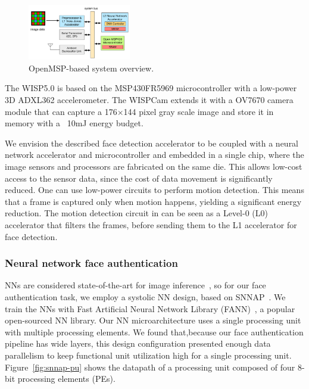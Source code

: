 \begin{figure}[h]
\centering
    \begin{center}
      \includegraphics[width=0.4\textwidth]{nsp-figs/system_overview.pdf}
    \end{center}
\caption{OpenMSP-based system overview.}
\label{fig:OMSP}
\end{figure}

The WISP5.0 is based on the MSP430FR5969 microcontroller with a low-power 3D ADXL362 accelerometer. The WISPCam extends it with a OV7670 camera module that can capture a 176$\times$144 pixel gray scale image and store it in memory with a ~10mJ energy budget.

We envision the described face detection accelerator to be coupled with a neural network accelerator and microcontroller and embedded in a single chip, where the image sensors and processors are fabricated on the same die. This allows low-cost access to the sensor data, since the cost of data movement is significantly reduced. One can use low-power circuits to perform motion detection. This means that a frame is captured only when motion happens, yielding a significant energy reduction. The motion detection circuit in \cite{multipower-isscc13} can be seen as a Level-0 (L0) accelerator that filters the frames, before sending them to the L1 accelerator for face detection.

\subsubsection{Neural network face authentication}

NNs are considered state-of-the-art for image inference~\cite{amos2016openface}, so for our face authentication task, we employ a systolic NN design, based on SNNAP~\cite{snnap,moreau-bitwidth}.
We train the NNs with Fast Artificial Neural Network Library (FANN)~\cite{fann}, a popular open-sourced NN library.
Our NN microarchitecture uses a single processing unit with multiple processing elements.
We found that,because our face authentication pipeline has wide layers, this design configuration presented enough data parallelism to keep functional unit utilization high for a single processing unit.
Figure~\ref{fig:snnap-pu} shows the datapath of a processing unit composed of four 8-bit processing elements (PEs).

